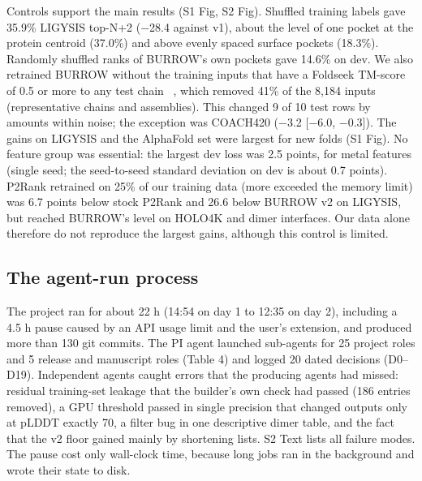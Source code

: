 \documentclass[10pt,letterpaper]{article}
\begin{document}
Controls support the main results (S1 Fig, S2 Fig). Shuffled training labels gave 35.9\% LIGYSIS top-N+2 ($-$28.4 against v1), about the level of one pocket at the protein centroid (37.0\%) and above evenly spaced surface pockets (18.3\%). Randomly shuffled ranks of BURROW's own pockets gave 14.6\% on dev. We also retrained BURROW without the training inputs that have a Foldseek TM-score of 0.5 or more to any test chain ~\cite{vankempen2024}, which removed 41\% of the 8,184 inputs (representative chains and assemblies). This changed 9 of 10 test rows by amounts within noise; the exception was COACH420 ($-$3.2 [$-$6.0, $-$0.3]). The gains on LIGYSIS and the AlphaFold set were largest for new folds (S1 Fig). No feature group was essential: the largest dev loss was 2.5 points, for metal features (single seed; the seed-to-seed standard deviation on dev is about 0.7 points). P2Rank retrained on 25\% of our training data (more exceeded the memory limit) was 6.7 points below stock P2Rank and 26.6 below BURROW v2 on LIGYSIS, but reached BURROW's level on HOLO4K and dimer interfaces. Our data alone therefore do not reproduce the largest gains, although this control is limited.

\subsection*{The agent-run process}

The project ran for about 22 h (14:54 on day 1 to 12:35 on day 2), including a 4.5 h pause caused by an API usage limit and the user's extension, and produced more than 130 git commits. The PI agent launched sub-agents for 25 project roles and 5 release and manuscript roles (Table 4) and logged 20 dated decisions (D0--D19). Independent agents caught errors that the producing agents had missed: residual training-set leakage that the builder's own check had passed (186 entries removed), a GPU threshold passed in single precision that changed outputs only at pLDDT exactly 70, a filter bug in one descriptive dimer table, and the fact that the v2 floor gained mainly by shortening lists. S2 Text lists all failure modes. The pause cost only wall-clock time, because long jobs ran in the background and wrote their state to disk.
\end{document}
